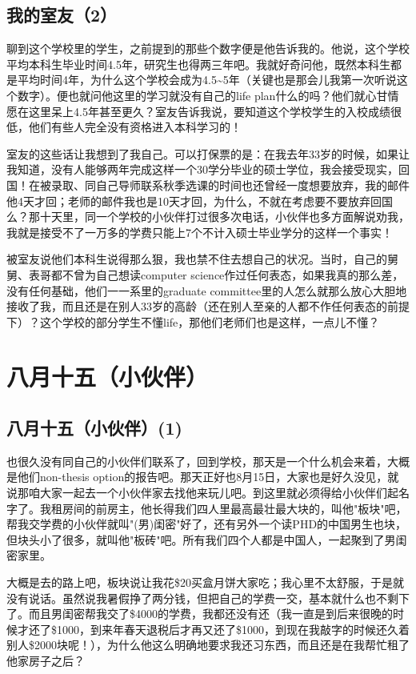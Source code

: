 \documentclass[12pt]{book}
\begin{document}
\section{我的室友（2）}
\label{sec-13-2}

聊到这个学校里的学生，之前提到的那些个数字便是他告诉我的。他说，这个学校平均本科生毕业时间4.5年，研究生也得两三年吧。我就好奇问他，既然本科生都是平均时间4年，为什么这个学校会成为4.5\textasciitilde{}5年（关键也是那会儿我第一次听说这个数字）。便也就问他这里的学习就没有自己的life plan什么的吗？他们就心甘情愿在这里呆上4.5年甚至更久？室友告诉我说，要知道这个学校学生的入校成绩很低，他们有些人完全没有资格进入本科学习的！

室友的这些话让我想到了我自己。可以打保票的是：在我去年33岁的时候，如果让我知道，没有人能够两年完成这样一个30学分毕业的硕士学位，我会接受现实，回国！在被录取、同自己导师联系秋季选课的时间也还曾经一度想要放弃，我的邮件他4天才回；老师的邮件我也是10天才回，为什么，不就在考虑要不要放弃回国么？那十天里，同一个学校的小伙伴打过很多次电话，小伙伴也多方面解说劝我，我就是接受不了一万多的学费只能上7个不计入硕士毕业学分的这样一个事实！

被室友说他们本科生说得那么狠，我也禁不住去想自己的状况。当时，自己的舅舅、表哥都不曾为自己想读computer science作过任何表态，如果我真的那么差，没有任何基础，他们一一系里的graduate committee里的人怎么就那么放心大胆地接收了我，而且还是在别人33岁的高龄（还在别人至亲的人都不作任何表态的前提下）？这个学校的部分学生不懂life，那他们老师们也是这样，一点儿不懂？

\chapter{八月十五（小伙伴）}
\label{sec-14}
\section{八月十五（小伙伴）(1)}
\label{sec-14-1}

也很久没有同自己的小伙伴们联系了，回到学校，那天是一个什么机会来着，大概是他们non-thesis option的报告吧。那天正好也8月15日，大家也是好久没见，就说那咱大家一起去一个小伙伴家去找他来玩儿吧。到这里就必须得给小伙伴们起名字了。我租房间的前房主，他长得我们四人里最高最壮最大块的，叫他"板块"吧，帮我交学费的小伙伴就叫"(男)闺密"好了，还有另外一个读PHD的中国男生也块，但块头小了很多，就叫他"板砖"吧。所有我们四个人都是中国人，一起聚到了男闺密家里。

大概是去的路上吧，板块说让我花\$20买盒月饼大家吃；我心里不太舒服，于是就没有说话。虽然说我暑假挣了两分钱，但把自己的学费一交，基本就什么也不剩下了。而且男闺密帮我交了\$4000的学费，我都还没有还（我一直是到后来很晚的时候才还了\$1000，到来年春天退税后才再又还了\$1000，到现在我敲字的时候还久着别人\$2000块呢！），为什么他这么明确地要求我还习东西，而且还是在我帮忙租了他家房子之后？
\end{document}
